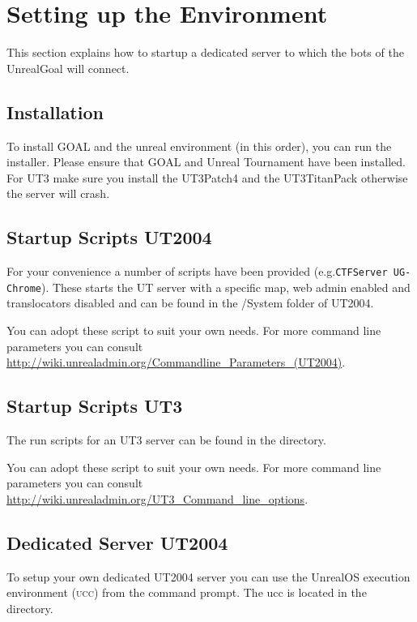 \documentclass[11pt,a4paper]{article}
\begin{document}
%
%
%
\section{Setting up the Environment}\label{sec:setup}

This section explains how to startup a dedicated server to which the bots of the UnrealGoal  will connect. 

\subsection{Installation}

To install GOAL and the unreal environment (in this order), you can run the installer.  Please ensure that GOAL and Unreal Tournament have been installed. For UT3 make sure you install the UT3Patch4 and the UT3TitanPack otherwise
the server will crash.

\subsection{Startup Scripts UT2004}

For your convenience a number of scripts have been provided (e.g.\verb|CTFServer UG-Chrome|). These starts the UT server with a specific map, web admin enabled and translocators disabled and can be found in the /System folder of UT2004.

You can adopt these script to suit your own needs. For more command line parameters you can consult \url{http://wiki.unrealadmin.org/Commandline_Parameters_(UT2004)}.

\subsection{Startup Scripts UT3}

The run scripts for an UT3 server can be found in the  directory.

You can adopt these script to suit your own needs. For more command line parameters you can consult \url{http://wiki.unrealadmin.org/UT3_Command_line_options}.

\subsection{Dedicated Server UT2004}

To setup your own dedicated UT2004 server you can use the UnrealOS execution environment (\textsc{ucc}) from the command prompt. The ucc is located in the  directory. 
\end{document}
